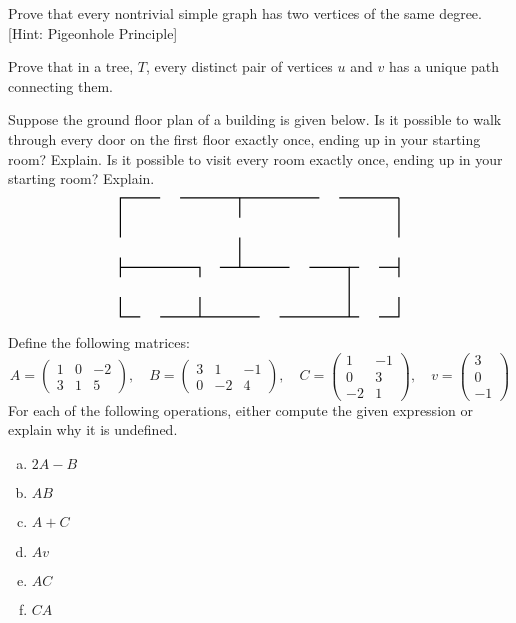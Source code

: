 \documentclass[11pt,letterpaper]{article}
\begin{document}
 Prove that every nontrivial simple graph has two vertices of the same degree. [Hint: Pigeonhole Principle] \pspace





\newpage





 Prove that in a tree, $T$, every distinct pair of vertices $u$ and $v$ has a unique path connecting them. \pspace





\newpage





 Suppose the ground floor plan of a building is given below. Is it possible to walk through every door on the first floor exactly once, ending up in your starting room? Explain. Is it possible to visit every room exactly once, ending up in your starting room? Explain. \pspace 
	\[
	\graphSix
	\] \pspace





\newpage





 Define the following matrices:
	\[
	A= 
	\begin{pmatrix}
	1 & 0 & -2 \\
	3 & 1 & 5 
	\end{pmatrix}, \quad
	B= 
	\begin{pmatrix}
	3 & 1 & -1 \\
	0 & -2 & 4
	\end{pmatrix}, \quad
	C=
	\begin{pmatrix}
	1 & -1 \\
	0 & 3 \\
	-2 & 1
	\end{pmatrix}, \quad
	v= 
	\begin{pmatrix}
	3 \\
	0 \\
	-1
	\end{pmatrix}
	\]
For each of the following operations, either compute the given expression or explain why it is undefined. 

\begin{enumerate}[(a)]
\item $2A - B$
\item $AB$
\item $A + C$
\item $Av$
\item $AC$
\item $CA$
\end{enumerate}
\end{document}

